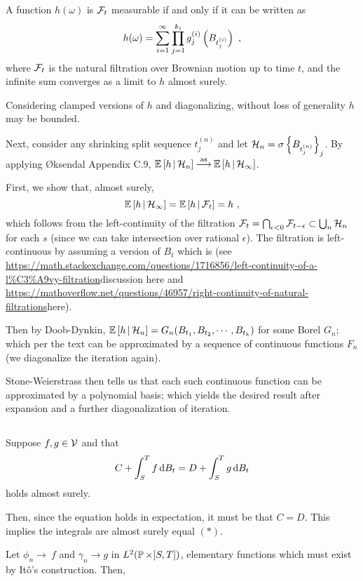 \documentclass{article}
\begin{document}
        A function \(h(\omega)\) is \(\mcF_t\) measurable if and only if it can be written as
        \[
h(\omega)=\sum_{i=1}^\infty \prod_{j=1}^{k_i}g^{(i)}_j\pa{B_{t_j^{(i)}}}\,\,,
\]
where \(\mcF_t\) is the natural filtration over Brownian motion up to time \(t\), and the infinite sum converges as a limit to \(h\) almost surely.

Considering clamped versions of \(h\) and diagonalizing, without loss of generality \(h\) may be bounded.

Next, consider any shrinking split sequence \(t_j^{(n)}\) and let \(\mcH_n=\sigma\ca{B_{t_j^{(n)}}}_j\). By applying {\O}ksendal Appendix C.9, \(\CE{h}{\mcH_n}\convas \CE{h}{\mcH_\infty}\).

First, we show that, almost surely,
\[
  \CE{h}{\mcH_\infty}=\CE{h}{\mcF_t}=h\,\,,
\]
which follows from the left-continuity of the filtration \(\mcF_t=\bigcap_{\epsilon<0}\mcF_{t-\epsilon}\subset\bigcup_n\mcH_n\) for each \(s\) (since we can take intersection over rational \(\epsilon\)). The filtration is left-continuous by assuming a version of \(B_t\) which is (see \url{https://math.stackexchange.com/questions/1716856/left-continuity-of-a-l%C3%A9vy-filtration}{discussion here} and \url{https://mathoverflow.net/questions/46957/right-continuity-of-natural-filtrations}{here}).

Then by Doob-Dynkin, \(\CE{h}{\mcH_n}=G_n(B_{t_1},B_{t_2},\cdots, B_{t_k})\) for some Borel \(G_n\); which per the text can be approximated by a sequence of continuous functions \(F_n\) (we diagonalize the iteration again).

Stone-Weierstrass then tells us that each such continuous function can be approximated by a polynomial basis; which yields the desired result after expansion and a further diagonalization of iteration.

        \subsection{}

        Suppose \(f,g\in\mcV\) and that
        \[
          C+\int_S^Tf\d{B_t}=D+\int_S^Tg\d{B_t}
        \]
        holds almost surely.

        Then, since the equation holds in expectation, it must be that \(C=D\). This implies the integrals are almost surely equal \((*)\).

        Let \(\phi_n\rightarrow\ f\) and \(\gamma_n\rightarrow g\) in \(L^2(\P\times[S,T])\), elementary functions which must exist by It\^{o}'s construction. Then,
\end{document}
